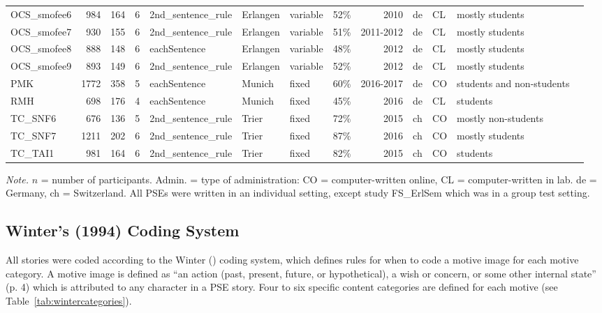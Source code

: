 \documentclass[man,a4paper,mask]{apa6}\usepackage[]{graphicx}\usepackage[]{color}
\begin{document}
\begin{table}
\begin{threeparttable}
\begin{tabularx}{\textwidth}{lrrrlllrrllll}
  OCS\_smofee6 & 984 & 164 &   6 & 2nd\_sentence\_rule & Erlangen & variable & 52\% & 2010 & de & CL & mostly students \\ 
  OCS\_smofee7 & 930 & 155 &   6 & 2nd\_sentence\_rule & Erlangen & variable & 51\% & 2011-2012 & de & CL & mostly students \\ 
  OCS\_smofee8 & 888 & 148 &   6 & eachSentence & Erlangen & variable & 48\% & 2012 & de & CL & mostly students \\ 
  OCS\_smofee9 & 893 & 149 &   6 & 2nd\_sentence\_rule & Erlangen & variable & 52\% & 2012 & de & CL & mostly students \\ 
  PMK & 1772 & 358 &   5 & eachSentence & Munich & fixed & 60\% & 2016-2017 & de & CO & students and non-students \\ 
  RMH & 698 & 176 &   4 & eachSentence & Munich & fixed & 45\% & 2016 & de & CL & students \\ 
  TC\_SNF6 & 676 & 136 &   5 & 2nd\_sentence\_rule & Trier & fixed & 72\% & 2015 & ch & CO & mostly non-students \\ 
  TC\_SNF7 & 1211 & 202 &   6 & 2nd\_sentence\_rule & Trier & fixed & 87\% & 2016 & ch & CO & mostly students \\ 
  TC\_TAI1 & 981 & 164 &   6 & 2nd\_sentence\_rule & Trier & fixed & 82\% & 2015 & ch & CO & students \\ 
   \hline


		\bottomrule
		\end{tabularx}
		\begin{tablenotes}[para,flushleft]
			{\small
			\vspace*{0.75em}
			\textit{Note.} $n$ = number of participants. Admin. = type of administration: CO = computer-written online, CL = computer-written in lab. de = Germany, ch = Switzerland. All PSEs were written in an individual setting, except study FS\_ErlSem which was in a group test setting.}
    \end{tablenotes}
\end{threeparttable}
\end{table}


\subsection{Winter's (1994) Coding System}
All stories were coded according to the Winter (\citeyear{winter_ManualScoringMotive_1994}) coding system, which defines rules for when to code a motive image for each motive category. A motive image is defined as ``an action (past, present, future, or hypothetical), a wish or concern, or some other internal state'' (p. 4) which is attributed to any character in a PSE story. Four to six specific content categories are defined for each motive (see Table~\ref{tab:wintercategories}). 
\end{document}
